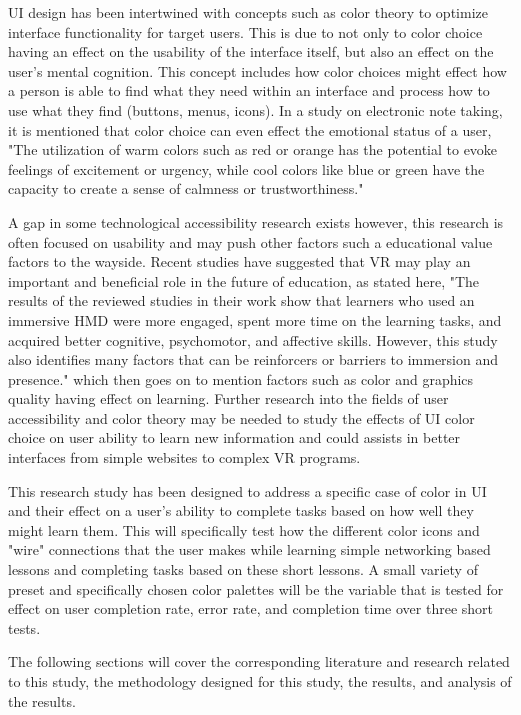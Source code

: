 \documentclass[acmlarge]{acmart}
\begin{document}
UI design has been intertwined with concepts such as color theory to optimize interface functionality for target users. This is due to not only to color
choice having an effect on the usability of the interface itself, but also an effect on the user's mental cognition. This concept includes how color choices might effect
how a person is able to find what they need within an interface and process how to use what they find (buttons, menus, icons). In a study on electronic note taking, it is mentioned
that color choice can even effect the emotional status of a user, "The utilization of warm colors such as red or orange has the potential to evoke feelings of excitement
or urgency, while cool colors like blue or green have the capacity to create a sense of calmness or trustworthiness." \cite{huang2024enhancing}

A gap in some technological accessibility research exists however, this research is often focused on usability and may
push other factors such a educational value factors to the wayside. Recent studies have suggested that VR may play an important and beneficial role in
the future of education, as stated here, "The results of the reviewed studies in their work show that learners who used an immersive HMD were more engaged,
spent more time on the learning tasks, and acquired better cognitive, psychomotor, and affective skills. However, this study also identifies many factors
that can be reinforcers or barriers to immersion and presence." \cite{radianti2020} which then goes on to mention factors such as color and graphics quality
having effect on learning. Further research into the fields of user accessibility and color theory may be needed to study the effects of UI color choice on user ability
to learn new information and could assists in better interfaces from simple websites to complex VR programs.

This research study has been designed to address a specific case of color in UI and their
effect on a user's ability to complete tasks based on how well they might learn them. This will specifically test how the different color icons and "wire"
connections that the user makes while learning simple networking based lessons and completing tasks based on these short lessons. A small variety of preset
and specifically chosen color palettes will be the variable that is tested for effect on user completion rate, error rate, and completion time over three short 
tests.

The following sections will cover the corresponding literature and research related to this study, the methodology designed for this study, the results, and analysis of the results.
\end{document}

